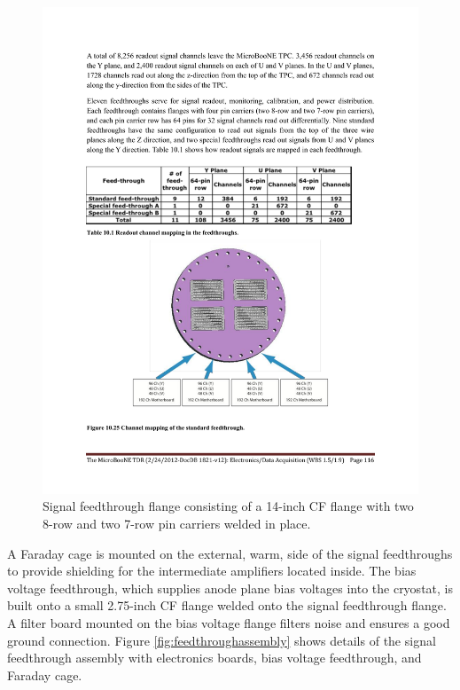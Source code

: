 \begin{figure}[hbt]
\begin{center}
\includegraphics[width=0.8\linewidth]{figures/signal_feedthrough_standard.pdf}
\end{center}
\caption{\label{fig:feedthroughflange}Signal feedthrough flange consisting of a 14-inch CF flange with two 8-row and two 7-row pin carriers welded in place.}
\end{figure}

A Faraday cage is mounted on the external, warm, side of the signal feedthroughs to provide shielding for the intermediate amplifiers located inside.  The bias voltage feedthrough, which supplies anode plane bias voltages into the cryostat, is built onto a small 2.75-inch CF flange welded onto the signal feedthrough flange. A filter board mounted on the bias voltage flange filters noise and ensures a good ground connection. Figure \ref{fig:feedthroughassembly} shows details of the signal feedthrough assembly with electronics boards, bias voltage feedthrough, and Faraday cage.

